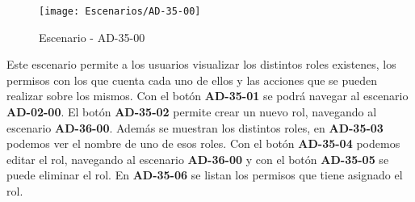 \begin{figure}[H]
\centering
\texttt{[image: Escenarios/AD-35-00]}
\caption{Escenario - AD-35-00}
\label{fig:AD-35-00}
\end{figure}

Este escenario permite a los usuarios visualizar los distintos roles existenes, los permisos con los que cuenta cada uno de ellos y las acciones que se pueden realizar sobre los mismos.
Con el botón \textbf{AD-35-01} se podrá navegar al escenario \textbf{AD-02-00}. El botón \textbf{AD-35-02} permite crear un nuevo rol, navegando al escenario \textbf{AD-36-00}. Además se muestran los distintos roles, en \textbf{AD-35-03} podemos ver el nombre de uno de esos roles. Con el botón \textbf{AD-35-04} podemos editar el rol, navegando al escenario \textbf{AD-36-00} y con el botón \textbf{AD-35-05} se puede eliminar el rol. En \textbf{AD-35-06} se listan los permisos que tiene asignado el rol.
\clearpage
